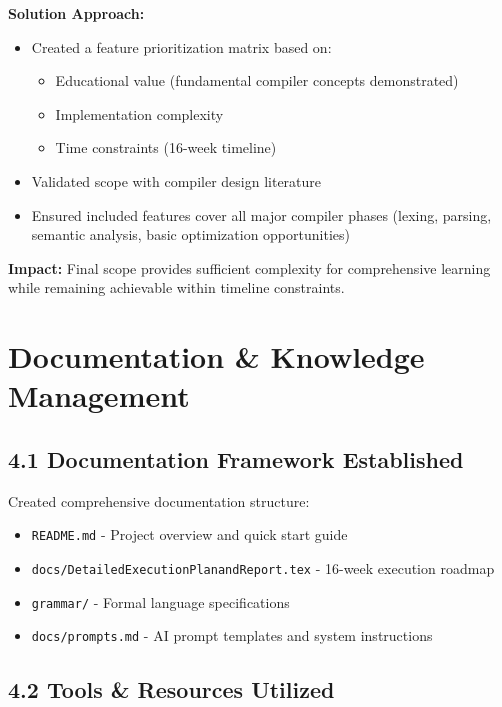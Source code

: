 \documentclass[a4paper,11pt]{article}
\begin{document}
\textbf{Solution Approach:}
\begin{itemize}[leftmargin=*]
    \item Created a feature prioritization matrix based on:
    \begin{itemize}
        \item Educational value (fundamental compiler concepts demonstrated)
        \item Implementation complexity
        \item Time constraints (16-week timeline)
    \end{itemize}
    \item Validated scope with compiler design literature
    \item Ensured included features cover all major compiler phases (lexing, parsing, semantic analysis, basic optimization opportunities)
\end{itemize}

\textbf{Impact:} Final scope provides sufficient complexity for comprehensive learning while remaining achievable within timeline constraints.

\section{Documentation \& Knowledge Management}

\subsection{4.1 Documentation Framework Established}

Created comprehensive documentation structure:
\begin{itemize}[leftmargin=*]
    \item \texttt{README.md} - Project overview and quick start guide
    \item \texttt{docs/DetailedExecutionPlanandReport.tex} - 16-week execution roadmap
    \item \texttt{grammar/} - Formal language specifications
    \item \texttt{docs/prompts.md} - AI prompt templates and system instructions
\end{itemize}

\subsection{4.2 Tools \& Resources Utilized}
\end{document}
